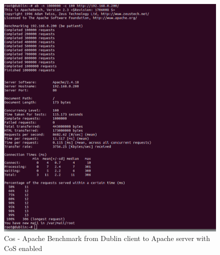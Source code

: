 \documentclass{article}
\begin{document}
\begin{figure}[H]
\centering
\includegraphics[width=14cm]{figures/dublin-ab2.png}
\caption{Cos - Apache Benchmark from Dublin client to Apache server with CoS enabled}
\centering
\label{fig:ab2_dublin_scenario_3}
\end{figure}
\end{document}
